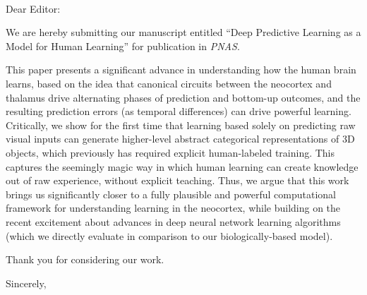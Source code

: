 \documentclass[11pt]{letter}
\begin{document}
\begin{letter}
{ \hspace*{.25in}\\}

\opening{Dear Editor:}

We are hereby submitting our manuscript entitled ``Deep Predictive Learning as a Model for Human Learning'' for publication in {\em PNAS}.  

This paper presents a significant advance in understanding how the human brain learns, based on the idea that canonical circuits between the neocortex and thalamus drive alternating phases of prediction and bottom-up outcomes, and the resulting prediction errors (as temporal differences) can drive powerful learning.  Critically, we show for the first time that learning based solely on predicting raw visual inputs can generate higher-level abstract categorical representations of 3D objects, which previously has required explicit human-labeled training.  This captures the seemingly magic way in which human learning can create knowledge out of raw experience, without explicit teaching.  Thus, we argue that this work brings us significantly closer to a fully plausible and powerful computational framework for understanding learning in the neocortex, while building on the recent excitement about advances in deep neural network learning algorithms (which we directly evaluate in comparison to our biologically-based model).

Thank you for considering our work.

\closing{Sincerely,}


\end{letter}
\end{document}
